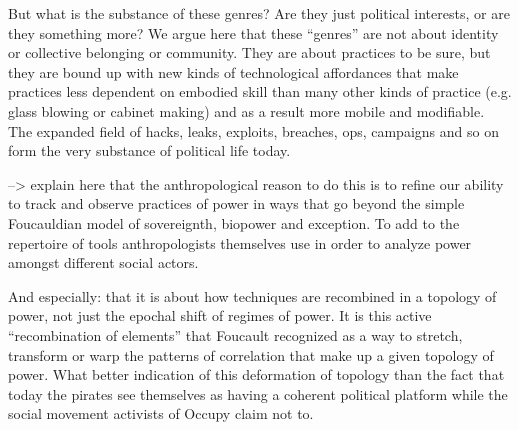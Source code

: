 \documentclass[10pt,letter,oneside]{scrartcl}
\begin{document}
But what is the substance of these genres?  Are they just political interests, or are they something more?  We argue here that these ``genres'' are not about identity or collective belonging or community.  They are about practices to be sure, but they are bound up with new kinds of technological affordances that make practices less dependent on embodied skill than many other kinds of practice (e.g. glass blowing or cabinet making) and as a result more mobile and modifiable.  The expanded field of hacks, leaks, exploits, breaches, ops, campaigns and so on form the very substance of political life today.  

--> explain here that the anthropological reason to do this is to refine our ability to track and observe practices of power in ways that go beyond the simple Foucauldian model of sovereignth, biopower and exception.  To add to the repertoire of tools anthropologists themselves use in order to analyze power amongst different social actors.  

{  And especially: that it is about how techniques are recombined in a topology of power, not just the epochal shift of regimes of power.   It is this active ``recombination of elements'' that Foucault recognized as a way to stretch, transform or warp the patterns of correlation that make up a given topology of power. What better indication of this deformation of topology than the fact that today the pirates see themselves as having a coherent political platform while the social movement activists of Occupy claim not to.}
\end{document}
